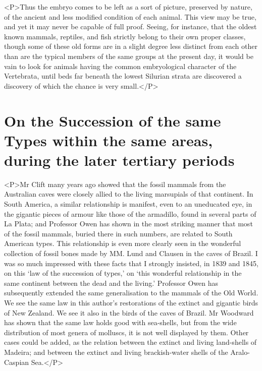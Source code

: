 <P>Thus the embryo comes to be left as a sort of picture, preserved by nature, of the ancient and less modified condition of each animal. This view may be true, and yet it may never be capable of full proof. Seeing, for instance, that the oldest known mammals, reptiles, and fish strictly belong to their own proper classes, though some of these old forms are in a slight degree less distinct from each other than are the typical members of the same groups at the present day, it would be vain to look for animals having the common embryological character of the Vertebrata, until beds far beneath the lowest Silurian strata are discovered a discovery of which the chance is very small.</P>

\section{On the Succession of the same Types within the same areas, during the later tertiary periods}
<P>Mr Clift many years ago showed that the fossil mammals from the Australian caves were closely allied to the living marsupials of that continent. In South America, a similar relationship is manifest, even to an uneducated eye, in the gigantic pieces of armour like those of the armadillo, found in several parts of La Plata; and Professor Owen has shown in the most striking manner that most of the fossil mammals, buried there in such numbers, are related to South American types. This relationship is even more clearly seen in the wonderful collection of fossil bones made by MM. Lund and Clausen in the caves of Brazil. I was so much impressed with these facts that I strongly insisted, in 1839 and 1845, on this `law of the succession of types,' on `this wonderful relationship in the same continent between the dead and the living.' Professor Owen has subsequently extended the same generalisation to the mammals of the Old World. We see the same law in this author's restorations of the extinct and gigantic birds of New Zealand. We see it also in the birds of the caves of Brazil. Mr Woodward has shown that the same law holds good with sea-shells, but from the wide distribution of most genera of molluscs, it is not well displayed by them. Other cases could be added, as the relation between the extinct and living land-shells of Madeira; and between the extinct and living brackish-water shells of the Aralo-Caspian Sea.</P>
